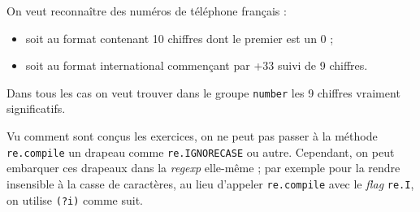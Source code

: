 \begin{exercise}[title=Numéros de téléphone, level=intermediate]
On veut reconnaître des numéros de téléphone français :
\begin{itemize}
\item soit au format contenant 10 chiffres dont le premier est un 0 ;
\item soit au format international commençant par +33 suivi de 9 chiffres.
\end{itemize}

Dans tous les cas on veut trouver dans le groupe \texttt{number} les 9 chiffres vraiment significatifs. 


\end{exercise}


Vu comment sont conçus les exercices, on ne peut pas passer à la méthode \texttt{re.compile} un drapeau comme \texttt{re.IGNORECASE} ou autre. 
Cependant, on peut embarquer ces drapeaux dans la \textit{regexp} elle-même ; par exemple pour la rendre insensible à la casse de caractères, au lieu d'appeler \texttt{re.compile} avec le \textit{flag} \texttt{re.I}, on utilise \texttt{(?i)} comme suit.

